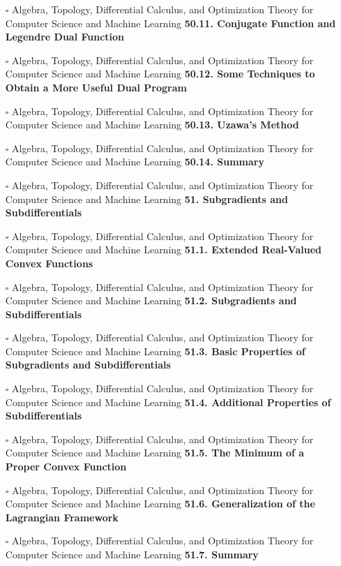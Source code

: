 \documentclass[a4, landscape, 12pt]{article}
\newcommand{\checkbox}{$\square$}%
\begin{document}
\begin{itemize}
{}
\item [\checkbox]  Algebra, Topology, Differential Calculus, and Optimization Theory for Computer Science and Machine Learning \textbf{ 50.11. Conjugate Function and Legendre Dual Function
}
\item [\checkbox]  Algebra, Topology, Differential Calculus, and Optimization Theory for Computer Science and Machine Learning \textbf{ 50.12. Some Techniques to Obtain a More Useful Dual Program
}
\item [\checkbox]  Algebra, Topology, Differential Calculus, and Optimization Theory for Computer Science and Machine Learning \textbf{ 50.13. Uzawa’s Method
}
\item [\checkbox]  Algebra, Topology, Differential Calculus, and Optimization Theory for Computer Science and Machine Learning \textbf{ 50.14. Summary
}
\item [\checkbox]  Algebra, Topology, Differential Calculus, and Optimization Theory for Computer Science and Machine Learning \textbf{ 51. Subgradients and Subdifferentials
}
\item [\checkbox]  Algebra, Topology, Differential Calculus, and Optimization Theory for Computer Science and Machine Learning \textbf{ 51.1. Extended Real-Valued Convex Functions
}
\item [\checkbox]  Algebra, Topology, Differential Calculus, and Optimization Theory for Computer Science and Machine Learning \textbf{ 51.2. Subgradients and Subdifferentials
}
\item [\checkbox]  Algebra, Topology, Differential Calculus, and Optimization Theory for Computer Science and Machine Learning \textbf{ 51.3. Basic Properties of Subgradients and Subdifferentials
}
\item [\checkbox]  Algebra, Topology, Differential Calculus, and Optimization Theory for Computer Science and Machine Learning \textbf{ 51.4. Additional Properties of Subdifferentials
}
\item [\checkbox]  Algebra, Topology, Differential Calculus, and Optimization Theory for Computer Science and Machine Learning \textbf{ 51.5. The Minimum of a Proper Convex Function
}
\item [\checkbox]  Algebra, Topology, Differential Calculus, and Optimization Theory for Computer Science and Machine Learning \textbf{ 51.6. Generalization of the Lagrangian Framework
}
\item [\checkbox]  Algebra, Topology, Differential Calculus, and Optimization Theory for Computer Science and Machine Learning \textbf{ 51.7. Summary
}
\end{itemize}
\end{document}
